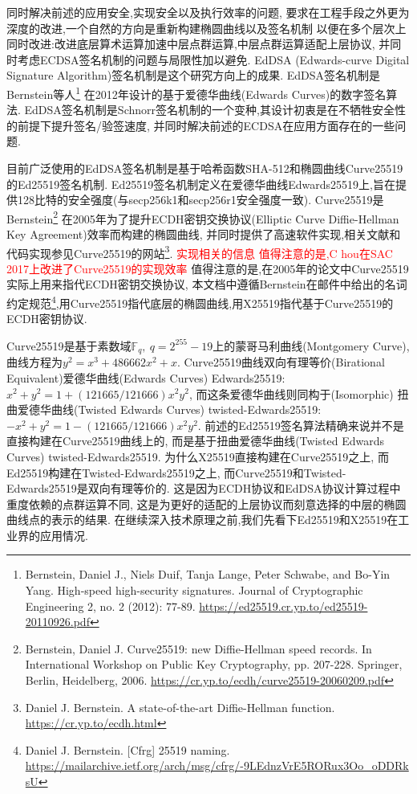 \documentclass{article}
\newcommand{\F}{\mathbb{F}}
\newcommand{\red}{\textcolor{red}}
\begin{document}
同时解决前述的应用安全,实现安全以及执行效率的问题,
要求在工程手段之外更为深度的改进,一个自然的方向是重新构建椭圆曲线以及签名机制
以便在多个层次上同时改进:改进底层算术运算加速中层点群运算,中层点群运算适配上层协议,
并同时考虑ECDSA签名机制的问题与局限性加以避免.
EdDSA (Edwards-curve Digital Signature Algorithm)签名机制是这个研究方向上的成果.
EdDSA签名机制是Bernstein等人\footnote{
Bernstein, Daniel J., Niels Duif, Tanja Lange, Peter Schwabe, and Bo-Yin Yang. 
High-speed high-security signatures. Journal of Cryptographic Engineering 2, no. 2 (2012): 77-89.
\url{https://ed25519.cr.yp.to/ed25519-20110926.pdf}}
在2012年设计的基于爱德华曲线(Edwards Curves)的数字签名算法.
EdDSA签名机制是Schnorr签名机制的一个变种,其设计初衷是在不牺牲安全性的前提下提升签名/验签速度,
并同时解决前述的ECDSA在应用方面存在的一些问题.

目前广泛使用的EdDSA签名机制是基于哈希函数SHA-512和椭圆曲线Curve25519的Ed25519签名机制.
Ed25519签名机制定义在爱德华曲线Edwards25519上,旨在提供128比特的安全强度(与secp256k1和secp256r1安全强度一致).
Curve25519是Bernstein\footnote{
Bernstein, Daniel J. Curve25519: new Diffie-Hellman speed records.
In International Workshop on Public Key Cryptography, pp. 207-228. Springer, Berlin, Heidelberg, 2006.
\url{https://cr.yp.to/ecdh/curve25519-20060209.pdf}}
在2005年为了提升ECDH密钥交换协议(Elliptic Curve Diffie-Hellman Key Agreement)效率而构建的椭圆曲线,
并同时提供了高速软件实现,相关文献和代码实现参见Curve25519的网站\footnote{
Daniel J. Bernstein. A state-of-the-art Diffie-Hellman function. \url{https://cr.yp.to/ecdh.html}}.
\red{实现相关的信息 值得注意的是,C hou在SAC 2017上改进了Curve25519的实现效率}
值得注意的是,在2005年的论文中Curve25519实际上用来指代ECDH密钥交换协议,
本文档中遵循Bernstein在邮件中给出的名词约定规范\footnote{
Daniel J. Bernstein. [Cfrg] 25519 naming.
\url{https://mailarchive.ietf.org/arch/msg/cfrg/-9LEdnzVrE5RORux3Oo_oDDRksU}
},用Curve25519指代底层的椭圆曲线,用X25519指代基于Curve25519的ECDH密钥协议.

Curve25519是基于素数域$\F_q, \ q = 2^{255}-19$上的蒙哥马利曲线(Montgomery Curve),
曲线方程为$y^2 = x^3 + 486662x^2 + x$.
Curve25519曲线双向有理等价(Birational Equivalent)爱德华曲线(Edwards Curves) Edwards25519:
$x^2 + y^2 = 1 + (121665/121666)x^2y^2$, 而这条爱德华曲线则同构于(Isomorphic)
扭曲爱德华曲线(Twisted Edwards Curves) twisted-Edwards25519: $-x^2+y^2 = 1 - (121665/121666)x^2y^2$.
前述的Ed25519签名算法精确来说并不是直接构建在Curve25519曲线上的,
而是基于扭曲爱德华曲线(Twisted Edwards Curves) twisted-Edwards25519.
为什么X25519直接构建在Curve25519之上, 而Ed25519构建在Twisted-Edwards25519之上,
而Curve25519和Twisted-Edwards25519是双向有理等价的.
这是因为ECDH协议和EdDSA协议计算过程中重度依赖的点群运算不同,
这是为更好的适配的上层协议而刻意选择的中层的椭圆曲线点的表示的结果.
在继续深入技术原理之前,我们先看下Ed25519和X25519在工业界的应用情况.
\end{document}
